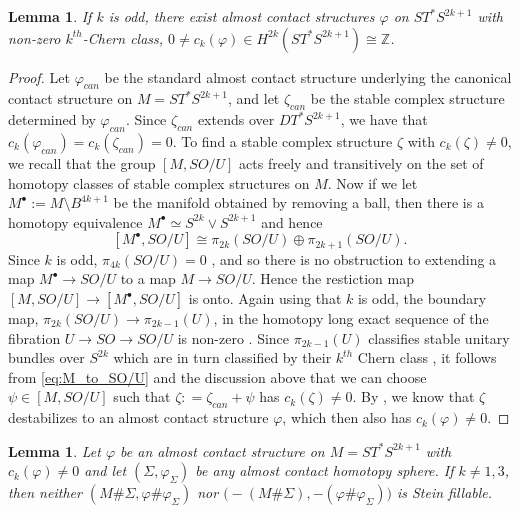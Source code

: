 \documentclass[12pt]{amsart}
\newcommand\Z{\mathbb{Z}}
\newcommand\scxs{\zeta}					%
\newtheorem{Lemma}[Theorem]{Lemma}
\theoremstyle{remark}
\newcommand{\jbcomm}[1]{\begingroup\color{green}JB:~#1\endgroup}
\begin{document}
\begin{Lemma} \label{lem:c_k}
If $k$ is odd, there exist almost contact structures $\varphi$ on
$ST^*S^{2k{+}1}$ with non{-}zero $k^{th}$-Chern class, $0\neq c_k(\varphi)
\in H^{2k}(ST^*S^{2k{+}1}) \cong \Z$.
\end{Lemma}
 
\begin{proof}
Let $\varphi_{can}$ be the standard almost
contact structure underlying the canonical contact structure
on $M = ST^*S^{2k{+}1}$,
and let $\scxs_{can}$ be the stable complex structure determined by
$\varphi_{can}$.  Since $\scxs_{can}$ extends over $DT^*S^{2k{+}1}$, we
have that $c_k(\varphi_{can}) = c_k(\scxs_{can}) = 0$.  
To find a stable complex structure $\scxs$ with $c_k(\scxs) \neq 0$, we recall that
the group $[M, SO/U]$ acts freely and transitively on the set of homotopy classes of 
stable complex structures on $M$.  Now if we let $M^\bullet := M \setminus B^{4k+1}$
be the manifold obtained by removing a ball, then there is a homotopy equivalence
$M^\bullet \simeq S^{2k} \vee S^{2k+1}$ and hence 
%
\begin{equation} \label{eq:M_to_SO/U}
[M^\bullet, SO/U] \cong \pi_{2k}(SO/U) \oplus \pi_{2k{+}1}(SO/U).
\end{equation}
%
Since $k$ is odd, $\pi_{4k}(SO/U) = 0$ \cite{Bott59}, and so there is no obstruction to extending
a map $M^\bullet \to SO/U$ to a map $M \to SO/U$.  Hence the restiction
map $[M, SO/U] \to [M^\bullet, SO/U]$ is onto.
Again using that $k$ is odd, the boundary map, $\pi_{2k}(SO/U) \to \pi_{2k{-}1}(U)$, 
in the homotopy long exact sequence of the fibration
$U \to SO \to SO/U$ is non{-}zero \cite{Bott59}.
Since $\pi_{2k{-}1}(U)$ classifies stable unitary bundles over $S^{2k}$
which are in turn classified by their $k^{th}$ Chern class
\cite[Proposition 9.1]{Husemoller94}, it follows from \eqref{eq:M_to_SO/U} and the discussion above
that we can choose
$\psi \in [M, SO/U]$ such that $\scxs : = \scxs_{can} + \psi$ has
$c_k(\scxs) \neq 0$.  By \cite[Lemma 2.17]{BCS2}, we know that
$\scxs$ destabilizes to an almost contact structure
$\varphi$, which then also has $c_k(\varphi) \neq 0$.
\end{proof} 
 
\begin{Lemma}\label{lem:non_filling_cotangent}
Let $\varphi$ be an almost contact structure on $M = ST^*S^{2k{+}1}$ with $c_k(\varphi) \neq 0$ 
and let $(\Sigma,\varphi_{\Sigma})$ be any almost contact homotopy
sphere. If $k \neq 1, 3$, then neither $(M \# \Sigma, \varphi \# \varphi_{\Sigma})$
nor  $\bigl( -(M \# \Sigma), -(\varphi \# \varphi_{\Sigma}) \bigr)$ 
is Stein fillable.
\end{Lemma}
\end{document}
